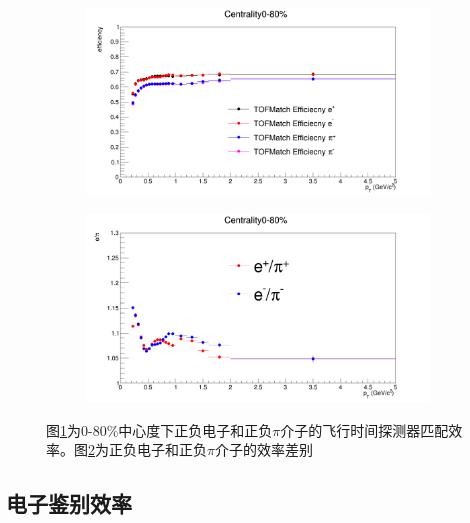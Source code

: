 \begin{figure}[htb]
    \centering
    \begin{subfigure}[b]{0.47\textwidth}
        \centering
        \includegraphics[width=\textwidth,clip]{figures/Chapter4/Eff_Centrality080.png}
        \caption{}
        \label{fig:TOF_match_eff}
    \end{subfigure}
    \hfill
    \begin{subfigure}[b]{0.47\textwidth}
        \centering
        \includegraphics[width=\textwidth,clip]{figures/Chapter4/Ratio_Centrality080.png}
        \caption{}
        \label{fig:pi_e_ratio}
    \end{subfigure}
       \caption[飞行时间探测器匹配效率]{图\ref{fig:TOF_match_eff}为0-80\%中心度下正负电子和正负$\pi$介子的飞行时间探测器匹配效率。图\ref{fig:pi_e_ratio}为正负电子和正负$\pi$介子的效率差别}
       \label{fig:TOFEff}
\end{figure}

\subsection{电子鉴别效率}

